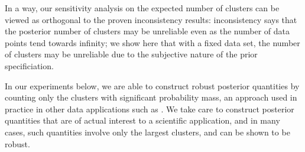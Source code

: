 In a way, our sensitivity analysis on the expected number of clusters can be viewed as
orthogonal to the proven inconsistency results: inconsistency says that the
posterior number of clusters may be unreliable even as the number of data points
tend towards infinity; we show here that with a fixed data set, the number of clusters
may be unreliable due to the subjective nature of the prior specificiation.

In our experiments below, we are able to construct robust posterior quantities
by counting only the clusters with significant probability mass,
an approach used in practice in other data applications such as \citet{fox:2007:dptracking}.
We take care to construct posterior quantities that are of actual interest to
a scientific application, and in many cases, such quantities involve only the
largest clusters, and can be shown to be robust.
